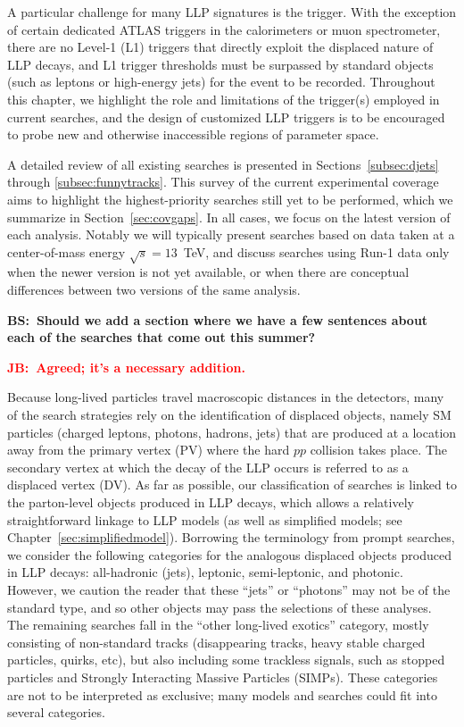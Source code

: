 A particular challenge for many LLP signatures is the trigger. With the exception of certain dedicated ATLAS triggers in the calorimeters or muon spectrometer, there are no Level-1 (L1) triggers that directly exploit the displaced nature of LLP decays, and L1 trigger thresholds must be surpassed by standard objects (such as leptons or high-energy jets) for the event to be recorded. Throughout this chapter, we highlight the role and limitations of the trigger(s) employed in current searches, and the design of customized LLP triggers is to be encouraged to probe new and otherwise inaccessible regions of parameter space.

A detailed review of all existing searches is presented in Sections~\ref{subsec:djets} through \ref{subsec:funnytracks}. This survey of the current experimental coverage aims to highlight the highest-priority searches still yet to be performed, which we summarize in Section~\ref{sec:covgaps}. In all cases, we focus on the latest version of each analysis. Notably we will typically present searches based on data taken at a center-of-mass energy $\sqrt{s}=13$~TeV, and discuss searches using Run-1 data only when the newer version is not yet available, or when there are conceptual differences between two versions of the same analysis.

{\bf BS:~Should we add a section where we have a few sentences about each of the searches that come out this summer?}

{\bf \textcolor{red}{JB:~Agreed; it's a necessary addition.} }

Because long-lived particles travel macroscopic distances in the detectors, many of the search strategies rely on the identification of displaced objects, namely SM particles (charged leptons, photons, hadrons, jets) that are produced at a location away from the primary vertex (PV) where the hard $pp$ collision takes place. The secondary vertex at which the decay of the LLP occurs is referred to as a displaced vertex (DV). As far as possible, our classification of searches is linked to the parton-level objects produced in LLP decays, which allows a relatively straightforward linkage to LLP models (as well as simplified models; see Chapter~\ref{sec:simplifiedmodel}). Borrowing the terminology from prompt searches, we  consider the following categories for the analogous displaced objects produced in LLP decays: all-hadronic (jets), leptonic, semi-leptonic, and photonic. However, we caution the reader that these ``jets'' or ``photons'' may not be of the standard type, and so other objects may pass the selections of these analyses. The remaining searches  fall in the ``other long-lived exotics'' category, mostly consisting of non-standard tracks (disappearing tracks,  heavy stable charged particles, quirks, etc), but also including some trackless signals, such as stopped particles and Strongly Interacting Massive Particles (SIMPs). These categories are not to be interpreted as exclusive; many models and searches could fit into several categories.

